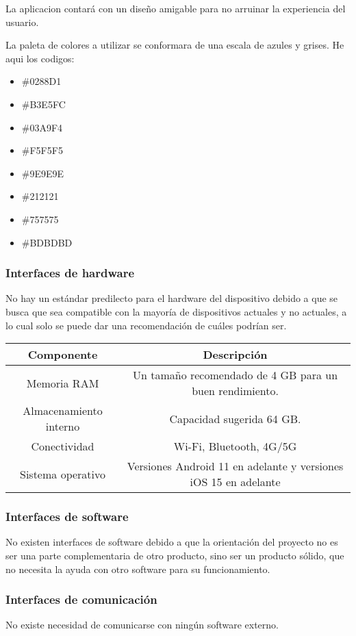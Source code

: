 \documentclass[12pt,a4paper, twosite]{article}
\begin{document}
La aplicacion contará con un diseño amigable para no arruinar la experiencia del usuario.

La paleta de colores a utilizar se conformara de una escala de azules y grises. He aqui los codigos:

\begin{itemize}
    \item \#0288D1
    \item \#B3E5FC
    \item \#03A9F4
    \item \#F5F5F5
    \item \#9E9E9E
    \item \#212121
    \item \#757575
    \item \#BDBDBD
\end{itemize}


\subsubsection{Interfaces de hardware}
No hay un estándar predilecto para el hardware del dispositivo debido a que se busca que sea compatible con la mayoría de dispositivos actuales y no actuales, a lo cual solo se puede dar una recomendación de cuáles podrían ser.

\begin{tabular}{|c|c|}
\hline
    Componente & Descripción \\
     \hline
     Memoria RAM & Un tamaño recomendado de 4 GB para un buen rendimiento. \\
     \hline
      Almacenamiento interno & Capacidad sugerida 64 GB. \\
     \hline
     Conectividad & Wi-Fi, Bluetooth, 4G/5G\\
     \hline
     Sistema operativo & Versiones Android 11 en adelante y versiones iOS 15 en adelante\\
     \hline
\end{tabular}

\subsubsection{Interfaces de software}
No existen interfaces de software debido a que la orientación del proyecto no es ser una parte complementaria de otro producto, sino ser un producto sólido, que no necesita la ayuda con otro software para su funcionamiento.


\subsubsection{Interfaces de comunicación}
No existe necesidad de comunicarse con ningún software externo.
\end{document}

